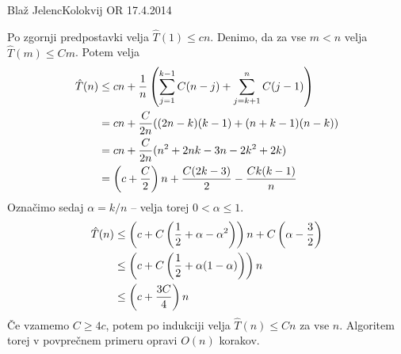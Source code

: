 \begin{naloga}{Blaž Jelenc}{Kolokvij OR 17.4.2014}
\begin{odgovor}
Po zgornji predpostavki velja $\hat{T}(1) \le cn$.
Denimo, da za vse $m < n$ velja $\hat{T}(m) \le Cm$.
Potem velja
\begin{align*}
\hat{T}(n) &\le cn +
{1 \over n} \left(\sum_{j=1}^{k-1} C(n-j) +
\sum_{j=k+1}^n C(j-1) \right) \\
&= cn + {C \over 2n} ((2n-k)(k-1) + (n+k-1)(n-k)) \\
&= cn + {C \over 2n} (n^2 + 2nk - 3n - 2k^2 + 2k) \\
&= \left(c + {C \over 2}\right) n + {C(2k - 3) \over 2} - {Ck(k-1) \over n}
\end{align*}
Označimo sedaj $\alpha = k/n$ -- velja torej $0 < \alpha \le 1$.
\begin{align*}
\hat{T}(n) &\le
\left(c + C \left({1 \over 2} + \alpha - \alpha^2\right) \right) n
+ C \left(\alpha - {3 \over 2}\right) \\
&\le \left(c + C \left({1 \over 2} + \alpha (1 - \alpha)\right) \right) n \\
&\le \left(c + {3C \over 4} \right) n
\end{align*}
Če vzamemo $C \ge 4c$,
potem po indukciji velja $\hat{T}(n) \le Cn$ za vse $n$.
Algoritem torej v povprečnem primeru opravi $O(n)$ korakov.
\end{odgovor}
\end{naloga}
